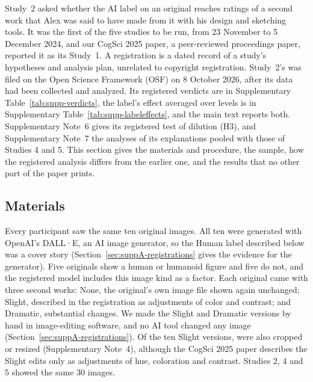 \label{sec:suppB-study2}

Study~2 asked whether the AI label on an original reaches ratings of a second work that Alex was said to have made from it with his design and sketching tools. It was the first of the five studies to be run, from 23 November to 5 December 2024, and our CogSci 2025 paper,\cite{kamper2025originalsin} a peer-reviewed proceedings paper, reported it as its Study~1. A registration is a dated record of a study's hypotheses and analysis plan, unrelated to copyright registration. Study~2's was filed on the Open Science Framework (OSF) on 8 October 2026, after its data had been collected and analyzed. Its registered verdicts are in Supplementary Table~\ref{tab:supp-verdicts}, the label's effect averaged over levels is in Supplementary Table~\ref{tab:supp-labeleffects}, and the main text reports both. Supplementary Note~6 gives its registered test of dilution (H3), and Supplementary Note~7 the analyses of its explanations pooled with those of Studies 4 and 5. This section gives the materials and procedure, the sample, how the registered analysis differs from the earlier one, and the results that no other part of the paper prints.

\subsection*{Materials}

Every participant saw the same ten original images. All ten were generated with OpenAI's DALL·E, an AI image generator, so the Human label described below was a cover story (Section~\ref{sec:suppA-registrations} gives the evidence for the generator). Five originals show a human or humanoid figure and five do not, and the registered model includes this image kind as a factor. Each original came with three second works: None, the original's own image file shown again unchanged; Slight, described in the registration as adjustments of color and contrast; and Dramatic, substantial changes. We made the Slight and Dramatic versions by hand in image-editing software, and no AI tool changed any image (Section~\ref{sec:suppA-registrations}). Of the ten Slight versions, \XSImageCheckSlightReframedN{} were also cropped or resized (Supplementary Note~4), although the CogSci 2025 paper describes the Slight edits only as adjustments of hue, coloration and contrast. Studies 2, 4 and 5 showed the same 30 images.

